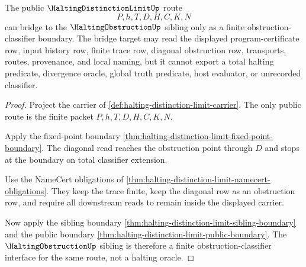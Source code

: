 \begin{theorem}
\label{thm:halting-distinction-limit-bridge-boundary}
The public $\HaltingDistinctionLimitUp$ route
$$
P,h,T,D,H,C,K,N
$$
can bridge to the $\HaltingObstructionUp$ sibling only as a finite obstruction-classifier boundary. The bridge target may read the displayed program-certificate row, input history row, finite trace row, diagonal obstruction row, transports, routes, provenance, and local naming, but it cannot export a total halting predicate, divergence oracle, global truth predicate, host evaluator, or unrecorded classifier.
\end{theorem}
\begin{proof}
Project the carrier of \autoref{def:halting-distinction-limit-carrier}. The only public route is the finite packet $P,h,T,D,H,C,K,N$.

Apply the fixed-point boundary \autoref{thm:halting-distinction-limit-fixed-point-boundary}. The diagonal read reaches the obstruction point through $D$ and stops at the boundary on total classifier extension.

Use the NameCert obligations of \autoref{thm:halting-distinction-limit-namecert-obligations}. They keep the trace finite, keep the diagonal row as an obstruction row, and require all downstream reads to remain inside the displayed carrier.

Now apply the sibling boundary \autoref{thm:halting-distinction-limit-sibling-boundary} and the public boundary \autoref{thm:halting-distinction-limit-public-boundary}. The $\HaltingObstructionUp$ sibling is therefore a finite obstruction-classifier interface for the same route, not a halting oracle.
\end{proof}


